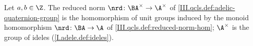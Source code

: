 Let $a,b\in\Z$. The reduced norm $\nrd\colon\BA^\times\to\A^\times$ of \cref{III.qcls.def:adelic-quaternion-group} is the homomorphism of unit groups induced by
the monoid homomorphism $\nrd\colon\BA\to\A$ of \cref{III.qcls.def:reduced-norm-hom}; $\A^\times$ is the group of ideles (\cref{I.adele.def:ideles}).
